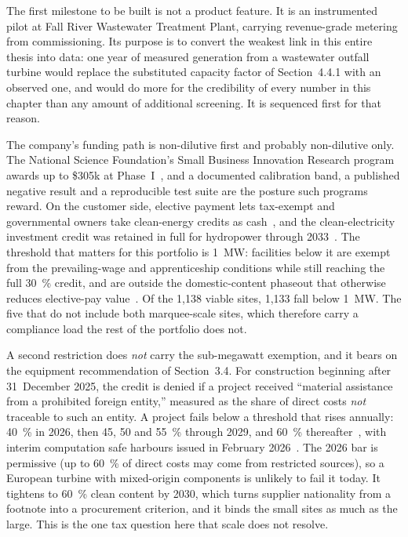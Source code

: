 \documentclass[12pt,letterpaper]{report}
\begin{document}
The first milestone to be built is not a product feature. It is an
instrumented pilot at Fall River Wastewater Treatment Plant, carrying revenue-grade
metering from commissioning. Its purpose is to convert the weakest link in this
entire thesis into data: one year of measured generation from a wastewater outfall
turbine would replace the substituted capacity factor of Section~4.4.1 with an
observed one, and would do more for the credibility of every number in this chapter
than any amount of additional screening. It is sequenced first for that reason.

The company's funding path is non-dilutive first and probably non-dilutive only. The
National Science Foundation's Small Business Innovation Research program awards up to
\$305k at Phase~I~\cite{nsf_sbir}, and a documented calibration band, a published
negative result and a reproducible test suite are the posture such programs reward. On
the customer side, elective payment lets tax-exempt and governmental owners take
clean-energy credits as cash~\cite{irs_elective_pay}, and the clean-electricity
investment credit was retained in full for hydropower through
2033~\cite{nha_obbba}. The threshold that matters for this
portfolio is 1~MW: facilities below it are exempt from the prevailing-wage and
apprenticeship conditions while still reaching the full 30~\% credit, and are
outside the domestic-content phaseout that otherwise reduces elective-pay
value~\cite{irs_pwa,irs_elective_pay,irs_notice_2024_84}. Of the 1,138 viable sites,
1,133 fall below 1~MW. The five that do not include both marquee-scale sites, which
therefore carry a compliance load the rest of the portfolio does not.

A second restriction does \emph{not} carry the sub-megawatt exemption, and it bears on
the equipment recommendation of Section~3.4. For construction beginning after
31~December 2025, the credit is denied if a project received ``material assistance from
a prohibited foreign entity,'' measured as the share of direct costs \emph{not} traceable
to such an entity. A project fails below a threshold that rises annually: 40~\% in 2026,
then 45, 50 and 55~\% through 2029, and 60~\% thereafter~\cite{usc7701}, with interim
computation safe harbours issued in February 2026~\cite{irs_notice_2026_15}. The 2026
bar is permissive (up to 60~\% of direct costs may come from restricted sources), so
a European turbine with mixed-origin components is unlikely to fail it today. It
tightens to 60~\% clean content by 2030, which turns supplier nationality from a
footnote into a procurement criterion, and it binds the small sites as much as the
large. This is the one tax question here that scale does not resolve.
\end{document}
